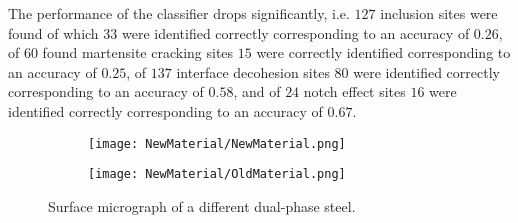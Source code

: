 %
%

The performance of the classifier drops significantly, i.e. $127$ inclusion sites were found of which $33$ were identified correctly corresponding to an accuracy of $0.26$, of $60$ found martensite cracking sites $15$ were correctly identified corresponding to an accuracy of $0.25$, of $137$ interface decohesion sites $80$ were identified correctly corresponding to an accuracy of $0.58$, and of $24$ notch effect sites $16$ were identified correctly corresponding to an accuracy of $0.67$. \\

\begin{figure}
\centering
\begin{subfigure}{0.48\textwidth}
\centering
\texttt{[image: NewMaterial/NewMaterial.png]}
\caption{}
\label{sub:NewMaterial}
\end{subfigure}
\centering
\begin{subfigure}{0.48\textwidth}
\centering
\texttt{[image: NewMaterial/OldMaterial.png]}
\caption{}
\label{sub:OldMaterial}
\end{subfigure}
\caption{Surface micrograph of a different dual-phase steel.}
\label{fig:newMaterial}
\end{figure}


